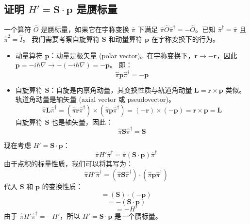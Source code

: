 \documentclass[12pt, a4paper]{article}
\begin{document}
\subsection{证明 \(H' = \mathbf{S} \cdot \mathbf{p}\) 是赝标量}
一个算符 \(\hat{O}\) 是赝标量，如果它在宇称变换 \(\hat{\pi}\) 下满足 \(\hat{\pi} \hat{O} \hat{\pi}^\dagger = -\hat{O}\)。已知 \(\hat{\pi}^\dagger = \hat{\pi}\) 且 \(\hat{\pi}^2 = \hat{I}\)。
我们需要考察自旋算符 \(\mathbf{S}\) 和动量算符 \(\mathbf{p}\) 在宇称变换下的行为。
\begin{itemize}
    \item 动量算符 \(\mathbf{p}\)：动量是极矢量 (polar vector)。在宇称变换下，\(\mathbf{r} \rightarrow -\mathbf{r}\)，因此 \(\mathbf{p} = -i\hbar \nabla \rightarrow -(-i\hbar \nabla) = -\mathbf{p}\)。
    即：
    \[ \hat{\pi} \mathbf{p} \hat{\pi}^\dagger = -\mathbf{p} \]
    \item 自旋算符 \(\mathbf{S}\)：自旋是内禀角动量，其变换性质与轨道角动量 \(\mathbf{L} = \mathbf{r} \times \mathbf{p}\) 类似。轨道角动量是轴矢量 (axial vector 或 pseudovector)。
    \[ \hat{\pi} \mathbf{L} \hat{\pi}^\dagger = (\hat{\pi} \mathbf{r} \hat{\pi}^\dagger) \times (\hat{\pi} \mathbf{p} \hat{\pi}^\dagger) = (-\mathbf{r}) \times (-\mathbf{p}) = \mathbf{r} \times \mathbf{p} = \mathbf{L} \]
    自旋算符 \(\mathbf{S}\) 也是轴矢量，因此：
    \[ \hat{\pi} \mathbf{S} \hat{\pi}^\dagger = \mathbf{S} \]
\end{itemize}
现在考虑 \(H' = \mathbf{S} \cdot \mathbf{p}\)：
\[ \hat{\pi} H' \hat{\pi}^\dagger = \hat{\pi} (\mathbf{S} \cdot \mathbf{p}) \hat{\pi}^\dagger \]
由于点积的标量性质，我们可以将其写为：
\[ \hat{\pi} H' \hat{\pi}^\dagger = (\hat{\pi} \mathbf{S} \hat{\pi}^\dagger) \cdot (\hat{\pi} \mathbf{p} \hat{\pi}^\dagger) \]
代入 \(\mathbf{S}\) 和 \(\mathbf{p}\) 的变换性质：
\[ = (\mathbf{S}) \cdot (-\mathbf{p}) \]
\[ = -(\mathbf{S} \cdot \mathbf{p}) \]
\[ = -H' \]
由于 \(\hat{\pi} H' \hat{\pi}^\dagger = -H'\)，所以 \(H' = \mathbf{S} \cdot \mathbf{p}\) 是一个赝标量。
\end{document}
